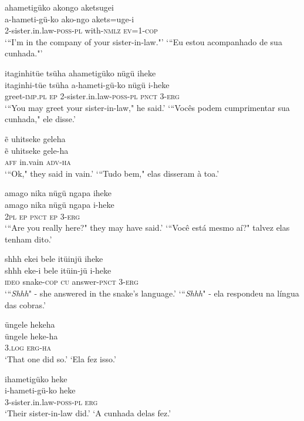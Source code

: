 \documentclass[output=paper,
modfonts,nonflat
]{langsci/langscibook}
\begin{document}
\ea  ahametigüko akongo aketsugei\\[.3em]
\gll a-hameti-gü-ko ako-ngo akets=uge-i\\
     2-sister.in.law-\textsc{poss}-\textsc{pl} with-\textsc{nmlz} \textsc{ev}=\textsc{1}-\textsc{cop}\\
\glt ‘“I'm in the company of your sister-in-law."’
\glt ‘“Eu estou acompanhado de sua cunhada."’
\z

\ea  itaginhitüe tsüha ahametigüko nügü iheke\\[.3em]
\gll itaginhi-tüe tsüha a-hameti-gü-ko nügü i-heke\\
     greet-\textsc{imp}.\textsc{pl} \textsc{ep} 2-sister.in.law-\textsc{poss}-\textsc{pl} \textsc{pnct} 3-\textsc{erg}\\
\glt ‘“You may greet your sister-in-law," he said.’
\glt ‘“Vocês podem cumprimentar sua cunhada," ele disse.’
\z

\ea  ẽ uhitseke geleha\\[.3em]
\gll ẽ uhitseke gele-ha\\
     \textsc{aff} in.vain \textsc{adv}-\textsc{ha}\\
\glt ‘“Ok," they said in vain.’
\glt ‘“Tudo bem," elas disseram à toa.’
\z

\ea  amago nika nügü ngapa iheke\\[.3em]
\gll amago nika nügü ngapa i-heke\\
     2\textsc{pl} \textsc{ep} \textsc{pnct} \textsc{ep} 3-\textsc{erg}\\
\glt ‘“Are you really here?" they may have said.’
\glt ‘“Você está mesmo aí?" talvez elas tenham dito.’
\z

\ea  shhh ekei bele itüinjü iheke\\[.3em]
\gll shhh eke-i bele itüin-jü i-heke\\
     \textsc{ideo} snake-\textsc{cop} \textsc{cu} answer-\textsc{pnct} 3-\textsc{erg}\\
\glt ‘“\textit{Shhh}" - she answered in the snake's language.’
\glt ‘“\textit{Shhh}" - ela respondeu na língua das cobras.’
\z

\ea  üngele hekeha\\[.3em]
\gll üngele heke-ha\\
     \textsc{3.log} \textsc{erg}-\textsc{ha}\\
\glt ‘That one did so.’
\glt ‘Ela fez isso.’
\z

\ea  ihametigüko heke\\[.3em]
\gll i-hameti-gü-ko heke\\
     3-sister.in.law-\textsc{poss}-\textsc{pl} \textsc{erg}\\
\glt ‘Their sister-in-law did.’
\glt ‘A cunhada delas fez.’
\z
\end{document}
